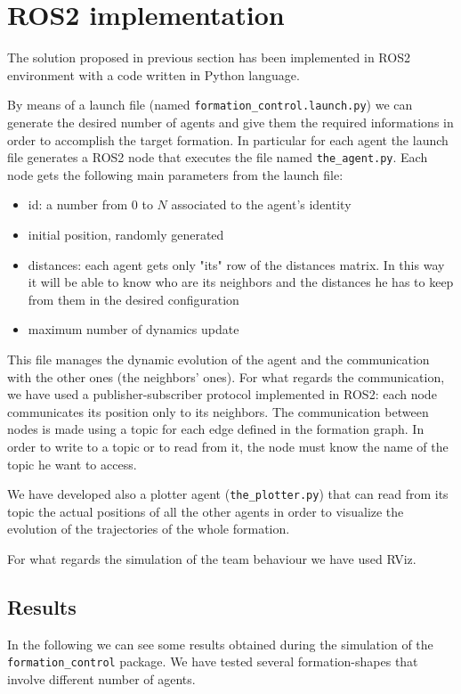 \documentclass[a4paper,11pt,oneside]{book}
\begin{document}
\section{ROS2 implementation}
The solution proposed in previous section has been implemented in ROS2 environment with a code written in Python language.

\bigskip
By means of a launch file (named \texttt{formation\_control.launch.py}) we can generate the desired number of agents and give them the required informations in order to accomplish the target formation. In particular for each agent the launch file generates a ROS2 node that executes the file named \texttt{the\_agent.py}. Each node gets the following main parameters from the launch file:
\begin{itemize}
\item id: a number from $0$ to $N$ associated to the agent's identity
\item initial position, randomly generated
\item distances: each agent gets only "its" row of the distances matrix. In this way it will be able to know who are its neighbors and the distances he has to keep from them in the desired configuration
\item maximum number of dynamics update
\end{itemize}
This file manages the dynamic evolution of the agent and the communication with the other ones (the neighbors' ones). For what regards the communication, we have used a publisher-subscriber protocol implemented in ROS2: each node communicates its position only to its neighbors. The communication between nodes is made using a topic for each edge defined in the formation graph. In order to write to a topic or to read from it, the node must know the name of the topic he want to access.

\bigskip
We have developed also a plotter agent (\texttt{the\_plotter.py}) that can read from its topic the actual positions of all the other agents in order to visualize the evolution of the trajectories of the whole formation.

For what regards the simulation of the team behaviour we have used RViz.

\subsection{Results}
In the following we can see some results obtained during the simulation of the \texttt{formation\_control} package. 
We have tested several formation-shapes that involve different number of agents.
\end{document}
